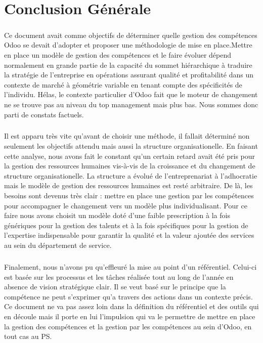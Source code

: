\chapter*{Conclusion Générale}
\paragraph{}Ce document avait comme objectifs de déterminer quelle gestion des compétences Odoo se devait d'adopter et proposer une méthodologie de mise en place.Mettre en place un modèle de gestion des compétences et le faire évoluer dépend normalement en grande partie de la capacité du sommet hiérarchique à traduire la stratégie de l’entreprise en opérations assurant qualité et profitabilité dans un contexte de marché à géométrie variable en tenant compte des spécificités de l’individu. Hélas, le contexte particulier d'Odoo fait que le moteur de changement ne se trouve pas au niveau du top management mais plus bas. Nous sommes donc parti de constats factuels. 

\paragraph{}Il est apparu très vite qu'avant de choisir une méthode, il fallait déterminé non seulement les objectifs attendu mais aussi la structure organisationelle. En faisant cette analyse, nous avons fait le constant qu'un certain retard avait été pris pour la gestion des ressources humaines vis-à-vis de la croissance et du changement de structure organisationelle. La structure a évolué de l'entreprenariat à l'adhocratie mais le modèle de gestion des ressources humaines est resté arbitraire. De là, les besoins sont devenus très clair : mettre en place une gestion par les compétences pour accompagner le changement vers un modèle plus individualisant. Pour ce faire nous avons choisit un modèle doté d'une faible prescription à la fois génériques pour la gestion des talents et à la fois spécifiques pour la gestion de l'expertise indispensable pour garantir la qualité et la valeur ajoutée des services au sein du département de service.

\paragraph{} Finalement, nous n'avons pu qu'effleuré la mise au point d'un référentiel. Celui-ci est basée sur les processus et les tâches réalisée tout au long de l'année en absence de vision stratégique clair. Il se veut basé sur le principe que la compétence ne peut s'exprimer qu'a travers des actions dans un contexte précis. Ce document ne va pas assez loin dans la définition du référentiel et des outils qui en découle mais il porte en lui l'impulsion qui va le permettre de mettre en place la gestion des compétences et la gestion par les compétences au sein d'Odoo, en tout cas au PS. 



